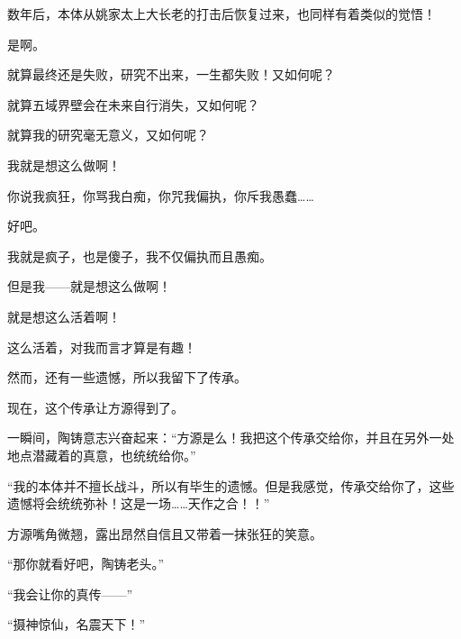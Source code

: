 \begin{this_body}
数年后，本体从姚家太上大长老的打击后恢复过来，也同样有着类似的觉悟！

是啊。

就算最终还是失败，研究不出来，一生都失败！又如何呢？

就算五域界壁会在未来自行消失，又如何呢？

就算我的研究毫无意义，又如何呢？

我就是想这么做啊！

你说我疯狂，你骂我白痴，你咒我偏执，你斥我愚蠢……

好吧。

我就是疯子，也是傻子，我不仅偏执而且愚痴。

但是我——就是想这么做啊！

就是想这么活着啊！

这么活着，对我而言才算是有趣！

然而，还有一些遗憾，所以我留下了传承。

现在，这个传承让方源得到了。

一瞬间，陶铸意志兴奋起来：“方源是么！我把这个传承交给你，并且在另外一处地点潜藏着的真意，也统统给你。”

“我的本体并不擅长战斗，所以有毕生的遗憾。但是我感觉，传承交给你了，这些遗憾将会统统弥补！这是一场……天作之合！！”

方源嘴角微翘，露出昂然自信且又带着一抹张狂的笑意。

“那你就看好吧，陶铸老头。”

“我会让你的真传——”

“摄神惊仙，名震天下！”

\end{this_body}

